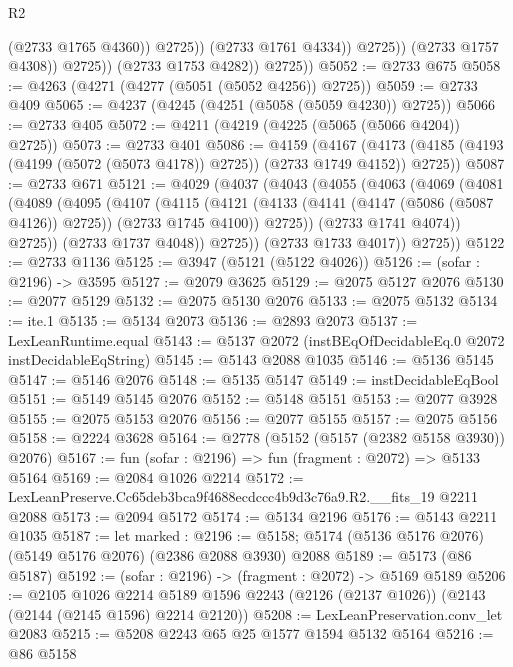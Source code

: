 \begin{lexlean}{R2}
\begin{coremodule}
                            (@2733 @1765 @4360))
                          @2725))
                      (@2733 @1761 @4334))
                    @2725))
                (@2733 @1757 @4308))
              @2725))
          (@2733 @1753 @4282))
        @2725))
@5052 := @2733 @675
@5058 := @4263 (@4271 (@4277 (@5051 (@5052 @4256)) @2725))
@5059 := @2733 @409
@5065 := @4237 (@4245 (@4251 (@5058 (@5059 @4230)) @2725))
@5066 := @2733 @405
@5072 := @4211 (@4219 (@4225 (@5065 (@5066 @4204)) @2725))
@5073 := @2733 @401
@5086 := @4159
    (@4167 (@4173 (@4185 (@4193 (@4199 (@5072 (@5073 @4178)) @2725)) (@2733 @1749 @4152)) @2725))
@5087 := @2733 @671
@5121 := @4029
    (@4037
      (@4043
        (@4055
          (@4063
            (@4069
              (@4081
                (@4089
                  (@4095
                    (@4107
                      (@4115
                        (@4121
                          (@4133 (@4141 (@4147 (@5086 (@5087 @4126)) @2725)) (@2733 @1745 @4100))
                          @2725))
                      (@2733 @1741 @4074))
                    @2725))
                (@2733 @1737 @4048))
              @2725))
          (@2733 @1733 @4017))
        @2725))
@5122 := @2733 @1136
@5125 := @3947 (@5121 (@5122 @4026))
@5126 := (sofar : @2196) -> @3595
@5127 := @2079 @3625
@5129 := @2075 @5127 @2076
@5130 := @2077 @5129
@5132 := @2075 @5130 @2076
@5133 := @2075 @5132
@5134 := ite.{1}
@5135 := @5134 @2073
@5136 := @2893 @2073
@5137 := LexLeanRuntime.equal
@5143 := @5137 @2072 (instBEqOfDecidableEq.{0} @2072 instDecidableEqString)
@5145 := @5143 @2088 @1035
@5146 := @5136 @5145
@5147 := @5146 @2076
@5148 := @5135 @5147
@5149 := instDecidableEqBool
@5151 := @5149 @5145 @2076
@5152 := @5148 @5151
@5153 := @2077 @3928
@5155 := @2075 @5153 @2076
@5156 := @2077 @5155
@5157 := @2075 @5156
@5158 := @2224 @3628
@5164 := @2778 (@5152 (@5157 (@2382 @5158 @3930)) @2076)
@5167 := fun (sofar : @2196) => fun (fragment : @2072) => @5133 @5164
@5169 := @2084 @1026 @2214
@5172 := LexLeanPreserve.Cc65deb3bca9f4688ecdccc4b9d3c76a9.R2.__fits_19 @2211 @2088
@5173 := @2094 @5172
@5174 := @5134 @2196
@5176 := @5143 @2211 @1035
@5187 := let marked : @2196 := @5158;
  @5174 (@5136 @5176 @2076) (@5149 @5176 @2076) (@2386 @2088 @3930) @2088
@5189 := @5173 (@86 @5187)
@5192 := (sofar : @2196) -> (fragment : @2072) -> @5169 @5189
@5206 := @2105
    @1026
    @2214
    @5189
    @1596
    @2243
    (@2126 (@2137 @1026))
    (@2143 (@2144 (@2145 @1596) @2214 @2120))
@5208 := LexLeanPreservation.conv_let @2083
@5215 := @5208 @2243 @65 @25 @1577 @1594 @5132 @5164
@5216 := @86 @5158

\end{coremodule}
\end{lexlean}
